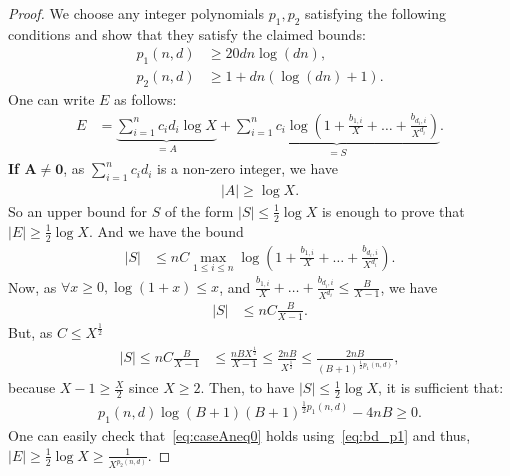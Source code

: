 \documentclass[a4paper, 11pt,dvipsnames]{article}
\newcommand\abs[1]{\left|#1\right|}
\begin{document}
\sumoflogsofpolyintsthm*
\begin{proof}
          We choose any integer polynomials $p_1, p_2$ satisfying the following conditions and show that they satisfy the claimed bounds:
          \begin{align}
              p_1(n,d) &\ge 20 dn \log(dn), \label{eq:bd_p1}\\
              p_2(n,d) &\ge 1 + dn(\log(dn) + 1). \label{eq:bd_p2}
          \end{align}
          One can write $E$ as follows: \begin{align*} E &=  \underbrace{ \sum_{i=1}^n c_i d_i \log X }_{= A} + \underbrace{ \sum_{i=1}^n c_i \log
          \left(  1  + \frac{b_{1,i}}{X} + \dots + \frac{b_{d_i,i}}{X^{d_i}} \right)  }_{= S}.  \end{align*}
          \textbf{If $\mathbf{A \neq 0}$}, as $\sum_{i=1}^n c_i d_i$ is a non-zero integer, we have \begin{align*} \abs{A} \ge \log X.
    \end{align*} So an upper bound for $S$ of the form $\abs{S} \le \frac{1}{2} \log X$ is enough to prove that $\abs E \ge \frac{1}{2}\log X$. And we have the bound \begin{align*} \abs{S} &\le n C \max_{1 \le i \le n } \log \left(  1  + \frac{b_{1,i}}{X} + \dots +
              \frac{b_{d_i,i}}{X^{d_i}} \right).  \end{align*}
Now, as $\forall x\ge 0 ,\log (1+x) \le x$, and $\frac{b_{1,i}}{X} + \dots + \frac{b_{d_i,i}}{X^{d_i}} \le \frac{B}{X -1}$, we have
                  \begin{align*} \abs{S} &\le n C \frac{B}{X - 1 }.  \end{align*}
But, as $C \le X^{\frac{1}{2}}$ 
                  \begin{align*} \left| S \right|  \le nC \frac{B}{X - 1 } &\le 
                   \frac{nB X^{\frac{1}{2}}}{X - 1} \le 
                  \frac{2nB}{X^{\frac{1}{2}}}\le
                  \frac{2nB}{(B+1)^{\frac{1}{2}p_1(n,d) }},  \end{align*}
                  because $X -1 \ge \frac{X}{2}$ since $X \ge 2$.
Then, to have $\left| S \right| \le \frac{1}{2}\log X$, it is sufficient that: \begin{align} p_1(n,d)\log(B+1)
                  (B+1)^{\frac{1}{2}p_1(n,d) } - 4nB \ge 0. 
                  \label{eq:caseAneq0} \end{align}
One can easily check that~\cref{eq:caseAneq0} holds using~\cref{eq:bd_p1} and thus, $\left|E\right| \ge \frac{1}{2}\log X \ge \frac{1}{X^{p_2(n,d)}} $.


\end{proof}
\end{document}
